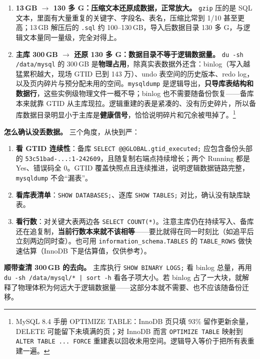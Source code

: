 \documentclass[12pt,UTF8]{ctexbook}
\begin{document}
\begin{enumerate}[leftmargin=2cm]
  \item \textbf{13\,GB $\to$ 130 多 G：压缩文本还原成数据，正常放大。} \texttt{gzip} 压的是 SQL 文本，里面有大量重复的关键字、字段名、表名，压缩比常到 1/10 甚至更高；13\,GB 解压后的 \texttt{.sql} 约 100--130\,GB，导入后数据目录 130 多 G，与逻辑文本量同一量级，完全对得上。
  \item \textbf{主库 300\,GB $\to$ 还原 130 多 G：数据目录不等于逻辑数据量。} \verb|du -sh /data/mysql| 的 300\,GB 是\textbf{物理占用}，除真实表数据外还含：binlog（写入越猛累积越大，现场 GTID 已到 143 万）、undo 表空间的历史版本、redo log，以及页内碎片与预分配未用的空间。\texttt{mysqldump} 是逻辑导出，\textbf{只导库表结构和数据行}，这些实例级物理文件一概不导；binlog 也不需要随备份恢复——备库本来就靠 GTID 从主库现拉。逻辑重建的表是紧凑的、没有历史碎片，所以备库数据目录明显小于主库是\textbf{健康信号}，恰恰说明碎片和冗余被甩掉了。\footnote{MySQL 8.4 手册 OPTIMIZE TABLE：InnoDB 页只填 93\% 留作更新余量，DELETE 可能留下未填满的页；对 InnoDB 而言 \texttt{OPTIMIZE TABLE} 映射到 \texttt{ALTER TABLE ... FORCE} 重建表以回收未用空间。逻辑导入等价于把所有表重建一遍。}
\end{enumerate}

\textbf{怎么确认没丢数据。} 三个角度，从快到严：

\begin{enumerate}[leftmargin=2cm]
  \item \textbf{看 GTID 连续性}：备库 \verb|SELECT @@GLOBAL.gtid_executed;| 应包含备份头部的 \verb|53c51bad-...:1-242609|，且随复制右端点持续增长；两个 Running 都是 Yes、错误码全 0。GTID 覆盖快照点且连续推进，说明逻辑数据链路完整，\texttt{mysqldump} 不会“漏表”。
  \item \textbf{看库表清单}：\verb|SHOW DATABASES;|、逐库 \verb|SHOW TABLES;| 对比，确认没有缺库缺表。
  \item \textbf{看行数}：对关键大表两边各 \verb|SELECT COUNT(*)|。注意主库仍在持续写入、备库还在追复制，\textbf{当前行数本来就不该相等}——要比就得在同一时刻比（如追平后立刻两边同时查）。也可用 \verb|information_schema.TABLES| 的 \verb|TABLE_ROWS| 做快速估算（InnoDB 下是估算值，仅供参考）。
\end{enumerate}

\textbf{顺带查清 300\,GB 的去向。} 主库执行 \verb|SHOW BINARY LOGS;| 看 binlog 总量，再用 \verb!du -sh /data/mysql/* | sort -h! 看各子项大小。若 binlog 占了一大块，就解释了物理体积为何远大于逻辑数据量——这部分本就不需要、也不应该随备份迁移。
\end{document}
